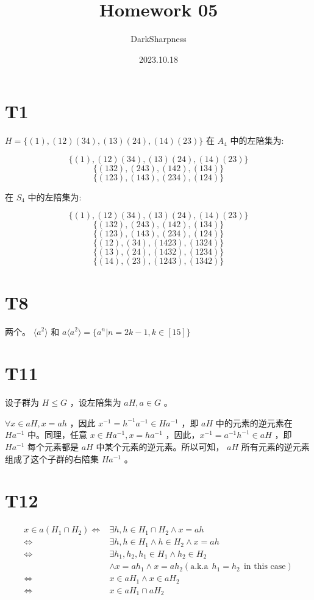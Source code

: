 \documentclass[fontset=windows]{article}
\title{\heiti\zihao{2} Homework 05}
\author{DarkSharpness}
\date{2023.10.18}
\begin{document}
	\maketitle
    \tableofcontents

\section*{T1}

$H=\{(1),(12)(34),(13)(24),(14)(23)\}$ 在 $A_4$ 中的左陪集为:

$$\{(1),(12)(34),(13)(24),(14)(23)\}$$
$$\{(132),(243),(142),(134)\}$$
$$\{(123),(143),(234),(124)\}$$

在 $S_4$ 中的左陪集为:

$$\{(1),(12)(34),(13)(24),(14)(23)\}$$
$$\{(132),(243),(142),(134)\}$$
$$\{(123),(143),(234),(124)\}$$
$$\{(12),(34),(1423),(1324)\}$$
$$\{(13),(24),(1432),(1234)\}$$
$$\{(14),(23),(1243),(1342)\}$$

\section*{T8}

两个。 $\langle a^2 \rangle$ 和 $a \langle a^2 \rangle = \{a^n | n = 2k - 1, k \in [15]\}$

\section*{T11}

设子群为 $H \le G$ ，设左陪集为 $aH, a \in G$ 。

$\forall x \in aH, x = ah$ ，因此 $x^{-1} = h^{-1}a^{-1} \in Ha^{-1}$ ，即 $aH$ 中的元素的逆元素在 $Ha^{-1}$ 中。同理，任意 $x \in Ha^{-1}, x = ha^{-1}$ ，因此，$x^{-1} = a^{-1}h^{-1} \in aH$ ，即 $Ha^{-1}$ 每个元素都是 $aH$ 中某个元素的逆元素。所以可知， $aH$ 所有元素的逆元素组成了这个子群的右陪集 $Ha^{-1}$ 。

\section*{T12}

$$
\begin{aligned}
    x \in a(H_1 \cap H_2)
    \iff & \exists h, h \in H_1 \cap H_2 \wedge x = ah \\
    \iff & \exists h, h \in H_1 \wedge h \in H_2 \wedge x = ah \\
    \iff & \exists h_1,h_2, h_1 \in H_1 \wedge h_2 \in H_2\\
    & \wedge x = ah_1 \wedge x = ah_2 (\text{a.k.a} ~\ h_1 = h_2 ~\ \text{in this case})\\
    \iff &x \in aH_1 \wedge x \in aH_2 \\
    \iff &x \in aH_1 \cap aH_2
\end{aligned}
$$
\end{document}
